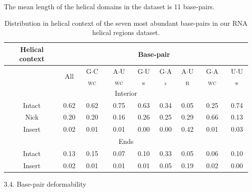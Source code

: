 The mean  length of the helical  domains in the dataset is 11 base-pairs. 

\begin{table}[htbp]
\begin{center}
\begin{tabular}{|c|c|c|c|c|c|c|c|c|}
\hline
Helical context & \multicolumn{8}{c|}{Base-pair} \\
\hline
 & All & G$\cdot$C$_{\text{WC}}$ & A$\cdot$U$_{\text{WC}}$ &
G$\cdot$U$_{\text{w}}$ & G$\cdot$A$_{\text{s}}$ &
A$\cdot$U$_{\text{H}}$ & G$\cdot$A$_{\text{WC}}$ &
U$\cdot$U$_{\text{w}}$  \\
\hline
\multicolumn{9}{|c|}{Interior} \\
\hline
Intact &  0.62 & 0.62 & 0.75 & 0.63 & 0.34 & 0.05 & 0.25 & 0.74 \\
Nick   &  0.20 & 0.20 & 0.16 & 0.26 & 0.25 & 0.29 & 0.66 & 0.13 \\
Insert &  0.02 & 0.01 & 0.01 & 0.00 & 0.00 & 0.42 & 0.01 & 0.03 \\
\hline
\multicolumn{9}{|c|}{Ends} \\
\hline
Intact &  0.13 & 0.15 & 0.07 & 0.10 & 0.33 & 0.05 & 0.06 & 0.10 \\
Insert &  0.02 & 0.01 & 0.01 & 0.01 & 0.05 & 0.19 & 0.02 & 0.00 \\
\hline
\end{tabular}
\caption{Distribution in helical context of the seven most abundant
  base-pairs in our RNA helical regions dataset.}
\label{tab:helcontext}
\end{center}
\end{table}





3.4. Base-pair deformability

